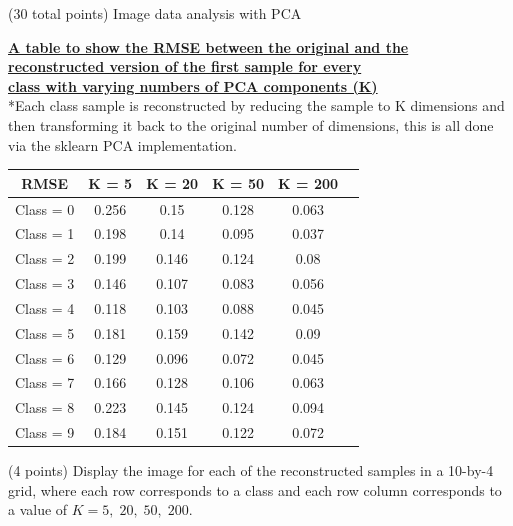 \documentclass[12pt]{article}
\begin{document}
\begin{question}{(30 total points) Image data analysis with PCA}
\begin{subquestion}
      \begin{answerbox}{28em}
        \begin{center}
        \large{\textbf{\underline{A table to show the RMSE between the original and the}}}\\
        \large{\textbf{\underline{reconstructed version of the first sample for every}}}\\
        \large{\textbf{\underline{class with varying numbers of PCA components (K)}}} \\
        \vspace{0.3cm}
        \normalsize{*Each class sample is reconstructed by reducing the sample to K dimensions and then transforming it back to the original number of dimensions, this is all done via the sklearn PCA implementation.}\\
        \vspace{0.5cm}
        \begin{tabular}{ |c|c|c|c|c|c| } \hline
            \textbf{RMSE} & K = 5 & K = 20 & K = 50 & K = 200 \\ \hline
            Class = 0 & 0.256 & 0.15 & 0.128 & 0.063 \\
            Class = 1 & 0.198 & 0.14 & 0.095 & 0.037 \\
            Class = 2 & 0.199 & 0.146 & 0.124 & 0.08 \\
            Class = 3 & 0.146 & 0.107 & 0.083 & 0.056 \\
            Class = 4 & 0.118 & 0.103 & 0.088 & 0.045 \\
            Class = 5 & 0.181 & 0.159 & 0.142 & 0.09 \\
            Class = 6 & 0.129 & 0.096 & 0.072 & 0.045 \\
            Class = 7 & 0.166 & 0.128 & 0.106 & 0.063 \\
            Class = 8 & 0.223 & 0.145 & 0.124 & 0.094 \\
            Class = 9 & 0.184 & 0.151 & 0.122 & 0.072 \\
            \hline
        \end{tabular}
        \end{center}
      \end{answerbox}
  


   \end{subquestion}
   
   \begin{subquestion}{(4 points)
       Display the image for each of the reconstructed samples in
       a 10-by-4 grid, where each row corresponds to a class and
       each row column corresponds to a value of $K=5, \; 20, \; 50, \; 200$.
     } \label{Q1.7}



\end{subquestion}
\end{question}
\end{document}
